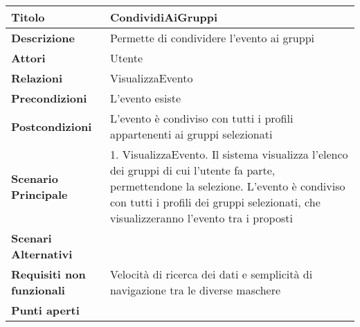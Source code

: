 \begin{tabular} {|P{4.5cm}|P{12.5cm}|}
  \hline
  \textbf{Titolo}                   & CondividiAiGruppi                                                                \\
  \hline
  \textbf{Descrizione}              & Permette di condividere l'evento ai gruppi                                       \\
  \hline
  \textbf{Attori}                   & Utente                                                                           \\
  \hline
  \textbf{Relazioni}                & VisualizzaEvento                                                                 \\
  \hline
  \textbf{Precondizioni}            & L'evento esiste                                                                  \\
  \hline
  \textbf{Postcondizioni}           & L'evento è condiviso con tutti i profili appartenenti ai gruppi selezionati      \\
  \hline
  \textbf{Scenario Principale}      & 1. VisualizzaEvento. Il sistema visualizza l'elenco dei gruppi di cui l'utente fa parte, permettendone la selezione. L'evento è condiviso con tutti i profili dei gruppi selezionati, che visualizzeranno l'evento tra i proposti      \\
  \hline
  \textbf{Scenari Alternativi}      &                                                                                  \\
  \hline
  \textbf{Requisiti non funzionali} & Velocità di ricerca dei dati e semplicità di navigazione tra le diverse maschere \\
  \hline
  \textbf{Punti aperti}             &                                                                                  \\
  \hline
\end{tabular}
\hfill
\break

